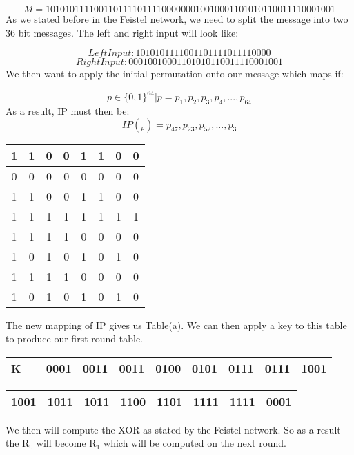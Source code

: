 \documentclass[11pt,a4paper]{report}
\begin{document}
\begin{displaymath}
M = 1010 1011 1100 1101 1110 1111 0000 0001 0010 0011 0101 0110 0111 1000 1001
\end{displaymath}
As we stated before in the Feistel network, we need to split the message into two 36 bit messages. The left and right input will look like:

\begin{displaymath}
Left Input: 1010 1011 1100 1101 1110 1111 0000
\end{displaymath}
\begin{displaymath}
Right Input: 0001 0010 0011 0101 0110 0111 1000 1001
\end{displaymath}
We then want to apply the initial permutation onto our message which maps if:

\begin{displaymath}
p \in \{0,1\}^{64} | p = p_{1}, p_{2}, p_{3}, p_{4},...,p_{64}
\end{displaymath}
As a result, IP must then be:
\begin{displaymath}
IP(_{p}) = p_{47}, p_{23}, p_{52},...,p_{3}
\end{displaymath}

\begin{center}
\begin{tabular}{ |c|c|c|c|c|c|c|c| }
\hline
1 & 1 & 0 & 0 & 1 & 1 & 0 & 0\\ \hline
0 & 0 & 0 & 0 & 0 & 0 & 0 & 0\\ \hline
1 & 1 & 0 & 0 & 1 & 1 & 0 & 0\\ \hline
1 & 1 & 1 & 1 & 1 & 1 & 1 & 1\\ \hline
1 & 1 & 1 & 1 & 0 & 0 & 0 & 0\\ \hline
1 & 0 & 1 & 0 & 1 & 0 & 1 & 0\\ \hline
1 & 1 & 1 & 1 & 0 & 0 & 0 & 0\\ \hline
1 & 0 & 1 & 0 & 1 & 0 & 1 & 0\\ \hline
\end{tabular}
\end{center}
The new mapping of IP gives us Table(a). We can then apply a key to this table to produce our first round table.

\begin{tabular}{|c|c|c|c|c|c|c|c|c|} \hline
K = & 0001 & 0011 & 0011 & 0100 & 0101 & 0111 & 0111 & 1001
\\ \hline
\end{tabular}

\begin{center}
\begin{tabular}{|c|c|c|c|c|c|c|c|} \hline
1001 & 1011 & 1011 & 1100 & 1101 & 1111 & 1111 & 0001\\ \hline
\end{tabular}
\end{center}
We then will compute the XOR as stated by the Feistel network. So as a result the R$_{0}$ will become R$_{1}$ which will be computed on the next round.
\end{document}
